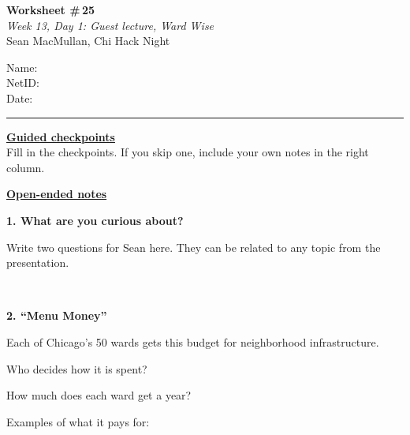 \documentclass[11pt]{article}
\newcommand{\blankspace}[1]{%
  \vspace{0.3em}
  \begin{minipage}[t][#1][t]{\linewidth}
  \end{minipage}
  \vspace{0.3em}
}
\newcommand{\guidedopen}[4]{%
  \noindent\textbf{#1}\\[0.18em]
  \noindent
  \begin{minipage}[t]{0.485\textwidth}
    #2
    \blankspace{#3}
  \end{minipage}
  \hfill
  \begin{minipage}[t]{0.485\textwidth}
    \blankspace{#4}
  \end{minipage}
  \\[0.4em]
}
\begin{document}
\RaggedRight

\noindent
\begin{minipage}[t]{0.55\textwidth}
  \vspace{0pt}
  {\LARGE \textbf{Worksheet \#\,25}} \\[0.18em]
  {\large \textit{Week 13, Day 1: Guest lecture, Ward Wise}} \\[0.18em]
  {\small Sean MacMullan, Chi Hack Night}
\end{minipage}
\hfill
\begin{minipage}[t]{0.40\textwidth}
  \vspace{0pt}
  \small
  Name: \underline{\hspace{4.5cm}} \\[0.35em]
  NetID: \underline{\hspace{4.3cm}} \\[0.35em]
  Date: \underline{\hspace{4.4cm}} \\
\end{minipage}

\vspace{0.5em}
\noindent\rule{\linewidth}{0.6pt}
\vspace{0.15em}
\vspace{0.45em}

\noindent
\begin{minipage}[t]{0.485\textwidth}
  \underline{\textbf{Guided checkpoints}}\\[0.2em]
  {\small Fill in the checkpoints. If you skip one, include your own notes in the right column.}
\end{minipage}\hfill
\begin{minipage}[t]{0.485\textwidth}
  \underline{\textbf{Open-ended notes}}\\[0.2em]
\end{minipage}
\vspace{0.5em}

\guidedopen{1. What are you curious about?}{
Write two questions for Sean here. They can be related to any topic from the presentation.
}{1.3cm}{2.2cm}

\vfill

\guidedopen{2. ``Menu Money''}{
Each of Chicago's 50 wards gets this budget for neighborhood infrastructure.

\vspace{0.3em}
Who decides how it is spent?
\vspace{1.0cm}

How much does each ward get a year?
\vspace{0.8cm}

Examples of what it pays for:
}{0.8cm}{3.6cm}
\end{document}
